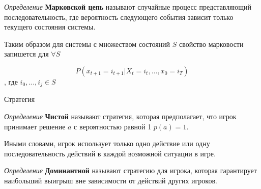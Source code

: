 
\textit{Определение} \textbf{Марковской цепь} называют случайные процесс представляющий последовательность, где вероятность следующего события зависит только текущего состояния системы. 

Таким образом для системы с множеством состояний $S$ свойство марковости запишется для $\forall S$

$$
    P(x_{t+1}=i_{t+1}|X_t=i_t,\dots,x_0=i_T)
$$
, где $i_0,\dots,i_j \in S$  

Стратегия 

\textit{Определение} \textbf{Чистой} называют стратегия, которая предполагает, что игрок принимает решение $a$ с вероятностью равной 1 $p(a)=1$. 

Иными словами, игрок использует только одно действие или одну последовательность действий в каждой возможной ситуации в игре.

\textit{Определение} \textbf{Доминантной} называют стратегию для игрока, которая гарантирует наибольший выигрыш вне зависимости от действий других игроков.



